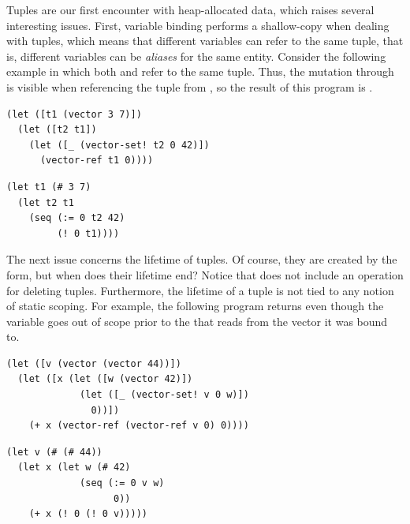 \documentclass[11pt]{book}
\newcommand{\ocaml}[1]{{\color{blue}{#1}}}
\begin{document}
{
Tuples are our first encounter with heap-allocated data, which raises
several interesting issues. First, variable binding performs a
shallow-copy when dealing with tuples, which means that different
variables can refer to the same tuple, that is, different variables
can be \emph{aliases} for the same entity. Consider the following
example in which both  and  refer to the same tuple.
Thus, the mutation through  is visible when referencing the
tuple from , so the result of this program is .
\begin{center}
\begin{minipage}{0.96\textwidth}
\begin{lstlisting}
(let ([t1 (vector 3 7)])
  (let ([t2 t1])
    (let ([_ (vector-set! t2 0 42)])
      (vector-ref t1 0))))
\end{lstlisting}
\end{minipage}
\begin{minipage}{0.96\textwidth}
\begin{lstlisting}[style=ocaml]
(let t1 (# 3 7)
  (let t2 t1
    (seq (:= 0 t2 42)
         (! 0 t1))))
\end{lstlisting}
\end{minipage}
\end{center}

The next issue concerns the lifetime of tuples. Of course, they are
created by the  form, but when does their lifetime end?
Notice that \LangVec{} \ocaml{(\LangTuple{})} does not include an operation for deleting
tuples. Furthermore, the lifetime of a tuple is not tied to any notion
of static scoping. For example, the following program returns
 even though the variable  goes out of scope prior to
the  that reads from the vector it was bound to.
\begin{center}
\begin{minipage}{0.96\textwidth}
\begin{lstlisting}
(let ([v (vector (vector 44))])
  (let ([x (let ([w (vector 42)])
             (let ([_ (vector-set! v 0 w)])
               0))])
    (+ x (vector-ref (vector-ref v 0) 0))))
\end{lstlisting}
\end{minipage}
\begin{minipage}{0.96\textwidth}
\begin{lstlisting}[style=ocaml]
(let v (# (# 44))
  (let x (let w (# 42)
             (seq (:= 0 v w)
                   0))
    (+ x (! 0 (! 0 v)))))
\end{lstlisting}
\end{minipage}
\end{center}

}
\end{document}
